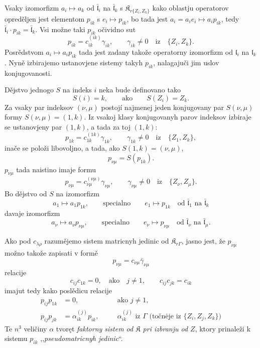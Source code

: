 \documentclass[11pt]{article}
\begin{document}
Vsaky izomorfizm \(a_i\mapsto a_k\) od \(\bar{\mathfrak l}_i\) na \(\bar{\mathfrak l}_k\) s \(\mathfrak K_{r\{Z_i,Z_k\}}\) kako oblastju operatorov opreděljen jest elementom \(p_{ik}\) s \(e_i\mapsto p_{ik}\), bo tada jest \(a_i=a_ie_i\mapsto a_ip_{ik}\), tedy \(\bar{\mathfrak l}_i\cdot p_{ik}=\bar{\mathfrak l}_k\). Vsi možne taki \(p_{ik}\) očividno sut
\[
p_{ik}=c_{ik}^{(ik)}\gamma_{ik},\qquad \gamma_{ik}\ne0\quad\text{iz}\quad \{Z_i,Z_k\}.
\]
Posrědstvom \(a_i\mapsto a_ip_{ik}\) tada jest zadany takože operatorny izomorfizm od \(\mathfrak l_i\) na \(\mathfrak l_k\). Nyně izbirajemo ustanovjene sistemy takyh \(p_{ik}\), nalagajuči jim uslov konjugovanosti.

Dějstvo jednogo \(S\) na indeks \(i\) neka bude definovano tako
\[
S(i)=k,\qquad\text{ako}\qquad S(Z_i)=Z_k.
\]
Za vsaky par indeksov \((\nu,\mu)\) postojí najmenej jeden konjugovany par \(S(\nu,\mu)\) formy \(S(\nu,\mu)=(1,k)\). Iz vsakoj klasy konjugovanyh parov indeksov izbiraje se ustanovjeny par \((1,k)\), a tada za toj \((1,k)\):
\[
p_{1k}=c_{1k}^{(1k)}\gamma_{1k},\qquad \gamma_{1k}\ne0\quad\text{iz}\quad \{Z_1,Z_k\},
\]
inače se položi libovoljno, a tada, ako \(S(1,k)=(\nu,\mu)\),
\[
p_{\nu\mu}=S(p_{1k}).
\]
\(p_{\nu\mu}\) tada naistino imaje formu
\[
p_{\nu\mu}=c_{\nu\mu}^{(\nu\mu)}\gamma_{\nu\mu},\qquad
\gamma_{\nu\mu}\ne0\quad\text{iz}\quad \{Z_\nu,Z_\mu\}.
\]
Bo dějstvo od \(S\) na izomorfizm
\[
a_1\mapsto a_1p_{1k},\qquad\text{specialno}\qquad e_1\mapsto p_{1k}
\quad\text{od }\bar{\mathfrak l}_1\text{ na }\bar{\mathfrak l}_k
\]
davaje izomorfizm
\[
a_\nu\mapsto a_\nu p_{\nu\mu},\qquad\text{specialno}\qquad e_\nu\mapsto p_{\nu\mu}
\quad\text{od }\bar{\mathfrak l}_\nu\text{ na }\bar{\mathfrak l}_\mu.
\]

Ako pod \(c_{\lambda\rho}\) razumějemo sistem matricnyh jedinic od \(\mathfrak K_{r\Gamma}\), jasno jest, že \(p_{\nu\mu}\) možno takože zapisati v formě
\[
p_{\nu\mu}=c_{\nu\mu}\bar\gamma_{\nu\mu}
\]
relacije
\[
c_{ij}c_{1k}=0,\quad\text{ako}\quad j\ne1,
\qquad
c_{ij}c_{jk}=c_{ik}
\]
imajut tedy kako poslědicu relacije
\[
\begin{aligned}
p_{ij}p_{1k}&=0,\quad &&\text{ako }j\ne1,\\
p_{ij}p_{jk}&=\alpha_{ik}^{(j)}p_{ik},\quad
&&\alpha_{ik}^{(j)}\text{ iz }\Gamma\text{ (točnėje iz }\{Z_i,Z_j,Z_k\}\text{)}
\end{aligned}
\]
Te \(n^3\) veličiny \(\alpha\) tvoręt \emph{faktorny sistem od \(\mathfrak K\) pri izbranju od \(Z\)}, ktory prinaleži k sistemu \(p_{ik}\) ,,\emph{pseudomatricnyh jedinic}``.
\end{document}

